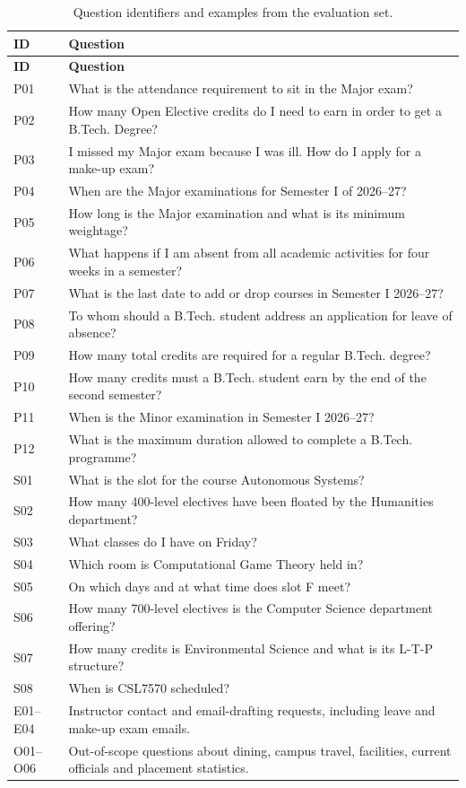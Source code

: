 \documentclass[11pt,a4paper]{article}
\begin{document}
\begin{longtable}{>{\raggedright\arraybackslash}p{} >{\raggedright\arraybackslash}p{}}
\caption{Question identifiers and examples from the evaluation set.}\\
\toprule
\textbf{ID} & \textbf{Question}\\
\midrule
\endfirsthead
\toprule
\textbf{ID} & \textbf{Question}\\
\midrule
\endhead
P01 & What is the attendance requirement to sit in the Major exam?\\
P02 & How many Open Elective credits do I need to earn in order to get a B.Tech. Degree?\\
P03 & I missed my Major exam because I was ill. How do I apply for a make-up exam?\\
P04 & When are the Major examinations for Semester I of 2026--27?\\
P05 & How long is the Major examination and what is its minimum weightage?\\
P06 & What happens if I am absent from all academic activities for four weeks in a semester?\\
P07 & What is the last date to add or drop courses in Semester I 2026--27?\\
P08 & To whom should a B.Tech. student address an application for leave of absence?\\
P09 & How many total credits are required for a regular B.Tech. degree?\\
P10 & How many credits must a B.Tech. student earn by the end of the second semester?\\
P11 & When is the Minor examination in Semester I 2026--27?\\
P12 & What is the maximum duration allowed to complete a B.Tech. programme?\\
S01 & What is the slot for the course Autonomous Systems?\\
S02 & How many 400-level electives have been floated by the Humanities department?\\
S03 & What classes do I have on Friday?\\
S04 & Which room is Computational Game Theory held in?\\
S05 & On which days and at what time does slot F meet?\\
S06 & How many 700-level electives is the Computer Science department offering?\\
S07 & How many credits is Environmental Science and what is its L-T-P structure?\\
S08 & When is CSL7570 scheduled?\\
E01--E04 & Instructor contact and email-drafting requests, including leave and make-up exam emails.\\
O01--O06 & Out-of-scope questions about dining, campus travel, facilities, current officials and placement statistics.\\
\bottomrule
\end{longtable}
\end{document}
